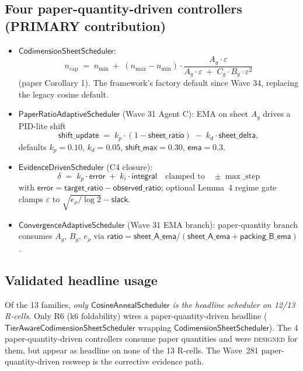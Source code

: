 \documentclass[journal,twocolumn,final]{IEEEtran}
\newcommand{\egap}{e_\rho}
\newcommand{\sheetA}{A_g}
\newcommand{\sheetB}{B_g}
\newcommand{\sheetC}{C_g}
\begin{document}
\subsection{Four paper-quantity-driven controllers (PRIMARY contribution)}

\begin{itemize}
\item $\mathsf{CodimensionSheetScheduler}$:
\begin{equation}\label{eq:codim}
n_\mathrm{cap} \;=\; n_\mathrm{min} \;+\; (n_\mathrm{max} - n_\mathrm{min})
\cdot \frac{\sheetA \cdot \varepsilon}{\sheetA \cdot \varepsilon \;+\;
\sheetC \cdot \sheetB \cdot \varepsilon^2}
\end{equation}
(paper Corollary 1). The framework's factory default since Wave 34, replacing
the legacy cosine default.

\item $\mathsf{PaperRatioAdaptiveScheduler}$ (Wave 31 Agent C): EMA on sheet
$\sheetA$ drives a PID-lite shift
\begin{equation}\label{eq:shift}
\mathsf{shift\_update} \;=\; k_p \cdot (1 - \mathsf{sheet\_ratio}) \;-\;
k_d \cdot \mathsf{sheet\_delta},
\end{equation}
defaults $k_p = 0.10$, $k_d = 0.05$, $\mathsf{shift\_max} = 0.30$, $\mathsf{ema}
= 0.3$.

\item $\mathsf{EvidenceDrivenScheduler}$ (C4 closure):
\begin{equation}\label{eq:eds}
\delta \;=\; k_p \cdot \mathsf{error} \;+\; k_i \cdot \mathsf{integral}
\quad\text{clamped to}\quad \pm\max\_\mathrm{step}
\end{equation}
with $\mathsf{error} = \mathsf{target\_ratio} - \mathsf{observed\_ratio}$;
optional Lemma~4 regime gate clamps $\varepsilon$ to
$\sqrt{\egap / \log 2} - \mathsf{slack}$.

\item $\mathsf{ConvergenceAdaptiveScheduler}$ (Wave 31 EMA branch): paper-quantity
branch consumes $\sheetA$, $\sheetB$, $\egap$ via
$\mathsf{ratio} = \mathsf{sheet\_A\_ema} / (\mathsf{sheet\_A\_ema} +
\mathsf{packing\_B\_ema})$.
\end{itemize}

\subsection{Validated headline usage}

Of the 13 families, \emph{only $\mathsf{CosineAnnealScheduler}$ is the headline
scheduler on 12/13 R-cells}. Only R6 (k6 foldability) wires a
paper-quantity-driven headline ($\mathsf{TierAwareCodimensionSheetScheduler}$
wrapping $\mathsf{CodimensionSheetScheduler}$). The 4 paper-quantity-driven
controllers consume paper quantities and were \textsc{designed} for them, but
appear as headline on none of the 13 R-cells. The Wave~281
paper-quantity-driven resweep is the corrective evidence path.
\end{document}
